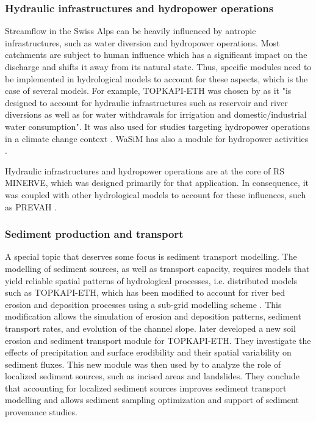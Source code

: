 \documentclass[10pt,a4paper]{article}
\begin{document}
\subsubsection{Hydraulic infrastructures and hydropower operations}
\label{sec:application:infrastructures}

Streamflow in the Swiss Alps can be heavily influenced by antropic infrastructures, such as water diversion and hydropower operations. Most catchments are subject to human influence which has a significant impact on the discharge and shifts it away from its natural state. Thus, specific modules need to be implemented in hydrological models to account for these aspects, which is the case of several models. For example, TOPKAPI-ETH was chosen by \citet{Fatichi2014} as it "is designed to account for hydraulic infrastructures such as reservoir and river diversions as well as for water withdrawals for irrigation and domestic/industrial water consumption". It was also used for studies targeting hydropower operations in a climate change context \citep{Fatichi_2015, Anghileri2018}. WaSiM has also a module for hydropower activities \citep{Verbunt2005}.

Hydraulic infrastructures and hydropower operations are at the core of RS MINERVE, which was designed primarily for that application. In consequence, it was coupled with other hydrological models to account for these influences, such as PREVAH \citep{Andres_2016, Stucki2018}.
 

\subsubsection{Sediment production and transport}
\label{sec:application:sediments}

A special topic that deserves some focus is sediment transport modelling. The modelling of sediment sources, as well as transport capacity, requires models that yield reliable spatial patterns of hydrological processes, i.e. distributed models such as TOPKAPI-ETH, which has been modified to account for river bed erosion and deposition processes using a sub-grid modelling scheme \citep{Konz2011}. This modification allows the simulation of erosion and deposition patterns, sediment transport rates, and evolution of the channel slope. \citet{Battista2020a} later developed a new soil erosion and sediment transport module for TOPKAPI-ETH. They investigate the effects of precipitation and surface erodibility and their spatial variability on sediment fluxes. This new module was then used by \citet{Battista2020} to analyze the role of localized sediment sources, such as incised areas and landslides. They conclude that accounting for localized sediment sources improves sediment transport modelling and allows sediment sampling optimization and support of sediment provenance studies.
\end{document}
